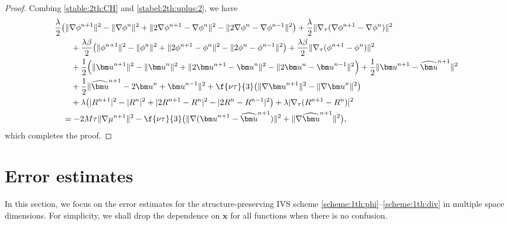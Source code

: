 \begin{proof}
	Combing \eqref{stable:2th:CH} and \eqref{stabel:2th:uplus:2}, we have
	\begin{equation*}  
		\begin{aligned}
			& \frac{\lambda}{2}\big(\|\nabla \phi^{n+1}\|^2 -\|\nabla \phi^{n}\|^2+ \|2\nabla \phi^{n+1}-\nabla \phi^n\|^2-\|2\nabla \phi^n-\nabla \phi^{n-1}\|^2 \big) + \frac{\lambda}{2} \|\nabla_\tau (\nabla \phi^{n+1} - \nabla \phi^n)\|^2\\
			& \qquad + \frac{\lambda \beta}{2}\big(\|\phi^{n+1}\|^2-\|\phi^{n}\|^2 + \|2 \phi^{n+1}-\phi^n\|^2-\|2\phi^n-\phi^{n-1}\|^2 \big) +  \frac{\lambda \beta }{2} \|\nabla_\tau (\phi^{n+1} -  \phi^n)\|^2 \\ 
			& \qquad + \frac{1}{2}\Big(\|{\bm u}^{n+1}\|^2-\|{\bm u}^{n}\|^2  + \|2\bm u^{n+1} - {\bm u}^{n}\|^2-\|2\bm u^{n} - {\bm u}^{n-1}\|^2 \Big) + \frac{1}{2} \|{\bm u}^{n+1}- \widehat{\bm u}^{n+1}\|^2  \\
			& \qquad + \frac{1}{2} \|\widehat{\bm u}^{n+1} - 2 {\bm u}^{n}+{\bm u}^{n-1}  \|^2 + \f{\nu \tau}{3}\big( \|\nabla {\bm u}^{n+1} \|^2-\|\nabla {\bm u}^{n} \|^2\big)  \\
			& \qquad + \lambda \big( |R^{n+1}|^2- |R^{n}|^2+|2R^{n+1}-R^n|^2 -|2R^{n}-R^{n-1}|^2 \big)+ \lambda |\nabla_\tau (R^{n+1} -  R^n)|^2 \\
			& \quad = -2 M \tau \|\nabla \mu^{n+1}\|^2 -\f{\nu \tau}{3} \big(\|\nabla({\bm u}^{n+1}- \widehat{\bm u}^{n+1})\|^2 + \|\nabla \widehat{\bm u}^{n+1}\|^2\big),
		\end{aligned}
	\end{equation*}
	which completes the proof.
\end{proof}
	
\section{Error estimates}\label{sec:error}
In this section, we focus on the error estimates for the structure-preserving IVS scheme \eqref{scheme:1th:phi}--\eqref{scheme:1th:div} in multiple space dimensions. For simplicity, we shall drop the dependence on $\bm x$ for all functions when there is no confusion.

